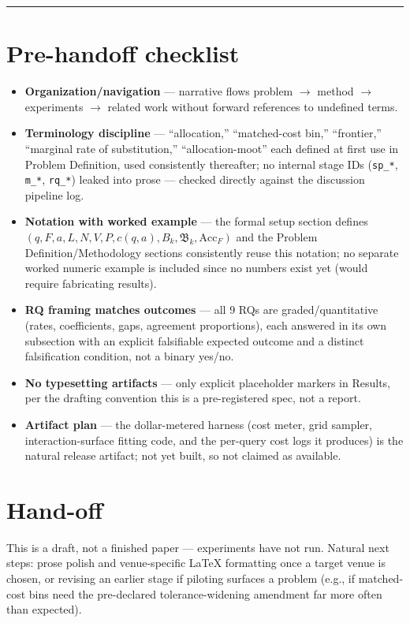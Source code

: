 \documentclass[11pt]{article}
\begin{document}
\vspace{1em}
\hrule
\vspace{1em}

\section*{Pre-handoff checklist}
\begin{itemize}[leftmargin=1.4em]
\item \textbf{Organization/navigation} --- narrative flows problem $\to$ method $\to$ experiments $\to$ related work without forward references to undefined terms.
\item \textbf{Terminology discipline} --- ``allocation,'' ``matched-cost bin,'' ``frontier,'' ``marginal rate of substitution,'' ``allocation-moot'' each defined at first use in Problem Definition, used consistently thereafter; no internal stage IDs (\texttt{sp\_*}, \texttt{m\_*}, \texttt{rq\_*}) leaked into prose --- checked directly against the discussion pipeline log.
\item \textbf{Notation with worked example} --- the formal setup section defines $(q, F, a, L, N, V, P, c(q,a), B_k, \mathfrak{B}_k, \text{Acc}_F)$ and the Problem Definition/Methodology sections consistently reuse this notation; no separate worked numeric example is included since no numbers exist yet (would require fabricating results).
\item \textbf{RQ framing matches outcomes} --- all 9 RQs are graded/quantitative (rates, coefficients, gaps, agreement proportions), each answered in its own subsection with an explicit falsifiable expected outcome and a distinct falsification condition, not a binary yes/no.
\item \textbf{No typesetting artifacts} --- only explicit placeholder markers in Results, per the drafting convention this is a pre-registered spec, not a report.
\item \textbf{Artifact plan} --- the dollar-metered harness (cost meter, grid sampler, interaction-surface fitting code, and the per-query cost logs it produces) is the natural release artifact; not yet built, so not claimed as available.
\end{itemize}

\section*{Hand-off}
This is a draft, not a finished paper --- experiments have not run. Natural next steps: prose polish and venue-specific LaTeX formatting once a target venue is chosen, or revising an earlier stage if piloting surfaces a problem (e.g., if matched-cost bins need the pre-declared tolerance-widening amendment far more often than expected).



\end{document}
